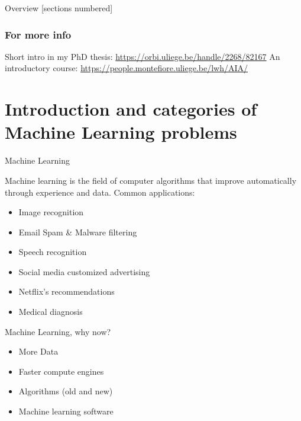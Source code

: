 \titleframe

\begin{frame}{Overview}
  [sections numbered]
  \tableofcontents[hideallsubsections]
\end{frame}


\begin{frame}
  \frametitle{For more info}

Short intro in my PhD thesis: \url{https://orbi.uliege.be/handle/2268/82167}
An introductory course: \url{https://people.montefiore.uliege.be/lwh/AIA/}


\end{frame}
\section{Introduction and categories of Machine Learning problems}
\begin{frame}{Machine Learning}
  
  Machine learning is the field of computer algorithms that improve automatically through experience and data.
  Common applications:
      \begin{itemize}
        \item Image recognition
        \item Email Spam \& Malware filtering
        \item Speech recognition
        \item Social media customized advertising
        \item Netflix's recommendations
        \item Medical diagnosis
      \end{itemize}
\end{frame}

\begin{frame}{Machine Learning, why now?}
      \begin{itemize}
        \item More Data
        \item Faster compute engines
        \item Algorithms (old and new)
        \item Machine learning software
      \end{itemize}
  
\end{frame}



